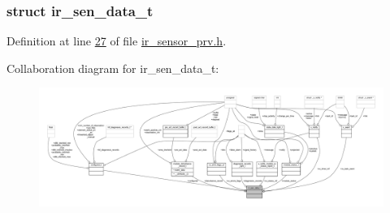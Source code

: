 \subsubsection{struct ir\+\_\+sen\+\_\+data\+\_\+t}


Definition at line \hyperlink{a00023_source_l00027}{27} of file \hyperlink{a00023_source}{ir\+\_\+sensor\+\_\+prv.\+h}.



Collaboration diagram for ir\+\_\+sen\+\_\+data\+\_\+t\+:\nopagebreak
\begin{figure}[H]
\begin{center}
\leavevmode
\includegraphics[width=350pt]{d0/df0/a00934}
\end{center}
\end{figure}
